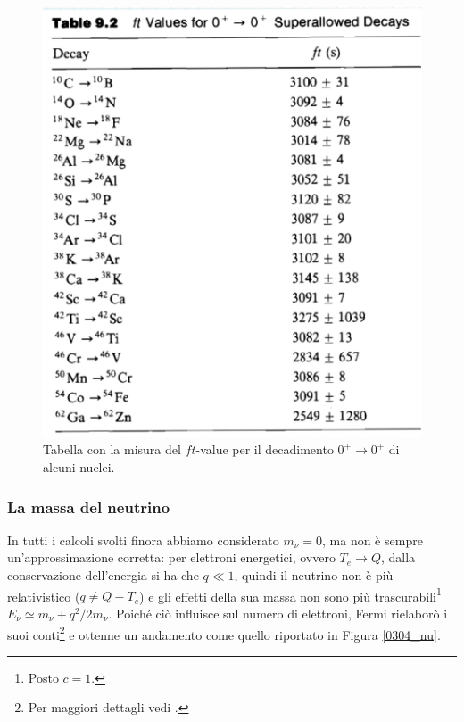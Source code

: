 \begin{figure}
    \centering
    \includegraphics[scale=0.2]{Immagini/0304_dati.png}
    \caption{Tabella con la misura del $ft$-value per il decadimento $0^+\to0^+$ di alcuni nuclei.}
    \label{0304_dati2}
\end{figure}

\subsubsection{La massa del neutrino}\label{sec-nu-mass}
In tutti i calcoli svolti finora abbiamo considerato $m_\nu=0$, ma non è sempre un'approssimazione corretta: per elettroni energetici, ovvero $T_e\to Q$, dalla conservazione dell'energia si ha che $q\ll 1$, quindi il neutrino non è più relativistico ($q\not = Q-T_e$) e gli effetti della sua massa non sono più trascurabili\footnote{Posto $c=1$.} $E_\nu \simeq m_\nu + q^2/2m_\nu$. Poiché ciò influisce sul numero di elettroni, Fermi rielaborò i suoi conti\footnote{Per maggiori dettagli vedi .} e ottenne un andamento come quello riportato in Figura \ref{0304_nu}.

